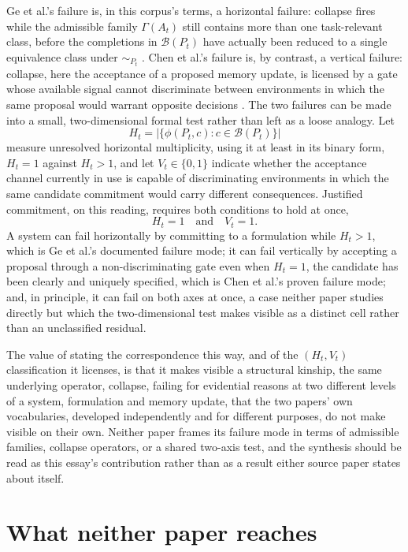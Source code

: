 \documentclass[11pt]{article}
\begin{document}
Ge et al.'s failure is, in this corpus's terms, a horizontal failure: collapse fires while the admissible family $\Gamma(A_t)$ still contains more than one task-relevant class, before the completions in $\mathcal{B}(P_t)$ have actually been reduced to a single equivalence class under $\sim_{P_t}$ \cite{ge2026ask}. Chen et al.'s failure is, by contrast, a vertical failure: collapse, here the acceptance of a proposed memory update, is licensed by a gate whose available signal cannot discriminate between environments in which the same proposal would warrant opposite decisions \cite{chen2026bilevel}. The two failures can be made into a small, two-dimensional formal test rather than left as a loose analogy. Let
$$H_t = \left|\{\phi(P_t,c) : c \in \mathcal{B}(P_t)\}\right|$$
measure unresolved horizontal multiplicity, using it at least in its binary form, $H_t = 1$ against $H_t > 1$, and let $V_t \in \{0,1\}$ indicate whether the acceptance channel currently in use is capable of discriminating environments in which the same candidate commitment would carry different consequences. Justified commitment, on this reading, requires both conditions to hold at once,
$$H_t = 1 \quad \text{and} \quad V_t = 1.$$
A system can fail horizontally by committing to a formulation while $H_t > 1$, which is Ge et al.'s documented failure mode; it can fail vertically by accepting a proposal through a non-discriminating gate even when $H_t = 1$, the candidate has been clearly and uniquely specified, which is Chen et al.'s proven failure mode; and, in principle, it can fail on both axes at once, a case neither paper studies directly but which the two-dimensional test makes visible as a distinct cell rather than an unclassified residual.

The value of stating the correspondence this way, and of the $(H_t, V_t)$ classification it licenses, is that it makes visible a structural kinship, the same underlying operator, collapse, failing for evidential reasons at two different levels of a system, formulation and memory update, that the two papers' own vocabularies, developed independently and for different purposes, do not make visible on their own. Neither paper frames its failure mode in terms of admissible families, collapse operators, or a shared two-axis test, and the synthesis should be read as this essay's contribution rather than as a result either source paper states about itself.

\section{What neither paper reaches}
\end{document}
